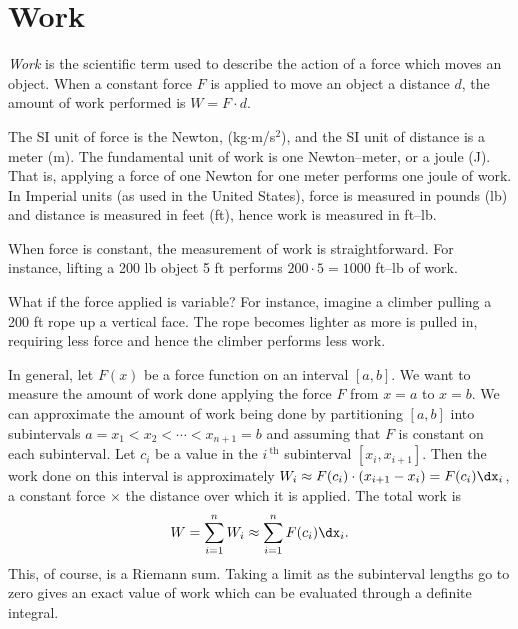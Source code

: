 \section{Work}\label{sec:work}

\textit{Work} is the scientific term used to describe the action of a force which moves an object. When a constant force $F$ is applied to move an object a distance $d$, the amount of work performed is $W=F\cdot d$. 

The SI unit of force is the Newton, (kg$\cdot$m/s$^2$), and the SI unit of distance is a meter (m). The fundamental unit of work is one Newton--meter, or a joule (J). That is, applying a force of one Newton for one meter performs one joule of work. In Imperial units (as used in the United States), force is measured in pounds (lb) and distance is measured in feet (ft), hence work is measured in ft--lb. 


When force is constant, the measurement of work is straightforward. For instance, lifting a 200 lb object 5 ft performs $200\cdot 5 = 1000$ ft--lb of work. 

What if the force applied is variable? For instance, imagine a climber pulling a 200 ft rope up a vertical face. The rope becomes lighter as more is pulled in, requiring less force and hence the climber performs less work.

In general, let $F(x)$ be a force function on an interval $[a,b]$. We want to measure the amount of work done applying the force $F$ from $x=a$ to $x=b$. We can approximate the amount of work being done by partitioning $[a,b]$ into subintervals $a=x_1<x_2 <\cdots <x_{n+1}=b$ and assuming that $F$ is constant on each subinterval. Let $c_i$ be a value in the $i\,^{\text{th}}$ subinterval $[x_i,x_{i+1}]$. Then the work done on this interval is approximately $W_i\approx F(c_i)\cdot(x_{i+1}-x_i) = F(c_i)\dx_i$, a constant force $\times$ the distance over which it is applied. The total work is 
$$ W = \sum_{i=1}^n W_i \approx \sum_{i=1}^n F(c_i)\dx_i.$$
This, of course, is a Riemann sum. Taking a limit as the subinterval lengths go to zero gives an exact value of work which can be evaluated through a definite integral.


